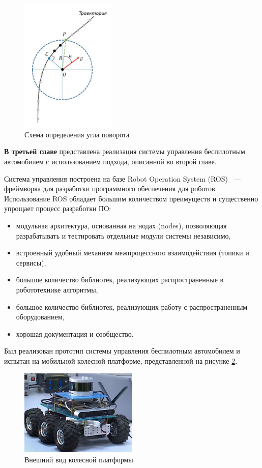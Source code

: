 \begin{figure}[h]
    \centering
    \includegraphics[width=0.4\textwidth]{images/path_moving}
    \caption{Схема определения угла поворота}
    \label{img:path_moving}
\end{figure}


\textbf{В третьей главе} представлена реализация системы управления беспилотным автомобилем с
использованием подхода, описанной во второй главе.

Система управления построена на базе Robot Operation System (ROS) ~--- фреймворка для разработки
программного обеспечения для роботов. Использование ROS обладает большим количеством преимуществ
и существенно упрощает процесс разработки ПО:
\begin{itemize}
    \item модульная архитектура, основанная на нодах (nodes), позволяющая разрабатывать
          и тестировать отдельные модули системы независимо,
    \item встроенный удобный механизм межпроцессного взаимодействия (топики и сервисы),
    \item большое количество библиотек, реализующих распространенные в робототехнике алгоритмы,
    \item большое количество библиотек, реализующих работу с распространенным оборудованием,
    \item хорошая документация и сообщество.
\end{itemize}

Был реализован прототип системы управления беспилотным автомобилем и испытан на мобильной
колесной платформе, представленной на рисунке \ref{img:car}.

\begin{figure}[h]
    \centering
    \includegraphics[width=0.5\textwidth]{images/car}
    \caption{Внешний вид колесной платформы}
    \label{img:car}
\end{figure}

